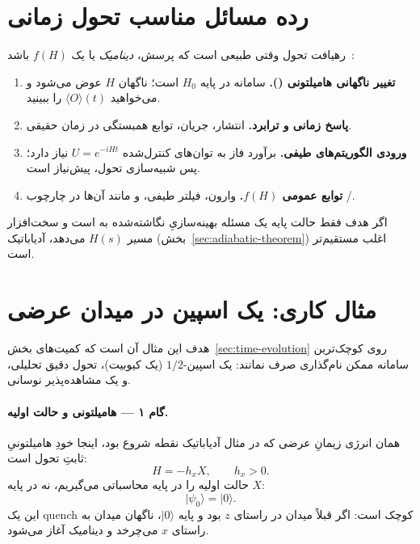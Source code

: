 \section{رده مسائل مناسب تحول زمانی}

رهیافت تحول وقتی طبیعی است که پرسش، \emph{دینامیک} یا یک $f(H)$ باشد~\cite{Lloyd1996,Childs2018}:
\begin{enumerate}
	\item \textbf{تغییر ناگهانی هامیلتونی ().} سامانه در پایه $H_0$ است؛ ناگهان $H$ عوض می‌شود و می‌خواهید $\langle O\rangle(t)$ را ببینید.
	\item \textbf{پاسخ زمانی و ترابرد.} انتشار، جریان، توابع همبستگی در زمان حقیقی.
	\item \textbf{ورودی الگوریتم‌های طیفی.} برآورد فاز به توان‌های کنترل‌شده $U=e^{-iHt}$ نیاز دارد؛ پس شبیه‌سازی تحول، پیش‌نیاز  است.
	\item \textbf{توابع عمومی $f(H)$.} وارون، فیلتر طیفی، و مانند آن‌ها در چارچوب /.
\end{enumerate}
اگر هدف فقط حالت پایه یک مسئله بهینه‌سازیِ نگاشته‌شده به  است و سخت‌افزار مسیر $H(s)$ می‌دهد، آدیاباتیک (بخش~\ref{sec:adiabatic-theorem}) اغلب مستقیم‌تر است.

\section{مثال کاری: یک اسپین در میدان عرضی}
\label{sec:evo-example}

هدف این مثال آن است که کمیت‌های بخش~\ref{sec:time-evolution} روی کوچک‌ترین سامانه ممکن نام‌گذاری صرف نمانند: یک اسپین-$1/2$ (یک کیوبیت)، تحول دقیق تحلیلی، و یک مشاهده‌پذیر نوسانی.

\paragraph{گام ۱ --- هامیلتونی و حالت اولیه.}
همان انرژی زیمانِ عرضی که در مثال آدیاباتیک نقطه شروع بود، اینجا خودِ هامیلتونیِ ثابتِ تحول است:
\begin{equation}
	\label{eq:H-rabi}
	H = -h_x X,
	\qquad h_x>0.
\end{equation}
حالت اولیه را در پایه محاسباتی می‌گیریم، نه در پایه $X$:
\begin{equation}
	\lvert\psi_0\rangle=\lvert0\rangle.
\end{equation}
این یک quench کوچک است: اگر قبلاً میدان در راستای $z$ بود و پایه $\lvert0\rangle$، ناگهان میدان به راستای $x$ می‌چرخد و دینامیک آغاز می‌شود.

